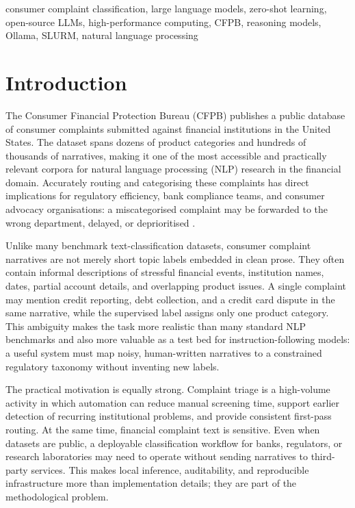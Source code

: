 \documentclass[journal]{IEEEtran}
\begin{document}
\begin{IEEEkeywords}
consumer complaint classification, large language models, zero-shot
learning, open-source LLMs, high-performance computing, CFPB,
reasoning models, Ollama, SLURM, natural language processing
\end{IEEEkeywords}

\section{Introduction}
\label{sec:intro}

The Consumer Financial Protection Bureau (CFPB) publishes a public
database of consumer complaints submitted against financial institutions
in the United States. The dataset spans dozens of product categories
and hundreds of thousands of narratives, making it one of the most
accessible and practically relevant corpora for natural language
processing (NLP) research in the financial domain. Accurately routing
and categorising these complaints has direct implications for
regulatory efficiency, bank compliance teams, and consumer advocacy
organisations: a miscategorised complaint may be forwarded to the wrong
department, delayed, or deprioritised
\cite{das2024explainable,liu2024framework,jondhale2024cfpb}.

Unlike many benchmark text-classification datasets, consumer complaint
narratives are not merely short topic labels embedded in clean prose.
They often contain informal descriptions of stressful financial events,
institution names, dates, partial account details, and overlapping
product issues. A single complaint may mention credit reporting, debt
collection, and a credit card dispute in the same narrative, while the
supervised label assigns only one product category. This ambiguity makes
the task more realistic than many standard NLP benchmarks and also more
valuable as a test bed for instruction-following models: a useful system
must map noisy, human-written narratives to a constrained regulatory
taxonomy without inventing new labels.

The practical motivation is equally strong. Complaint triage is a
high-volume activity in which automation can reduce manual screening
time, support earlier detection of recurring institutional problems,
and provide consistent first-pass routing. At the same time, financial
complaint text is sensitive. Even when datasets are public, a deployable
classification workflow for banks, regulators, or research laboratories
may need to operate without sending narratives to third-party services.
This makes local inference, auditability, and reproducible infrastructure
more than implementation details; they are part of the methodological
problem.
\end{document}
